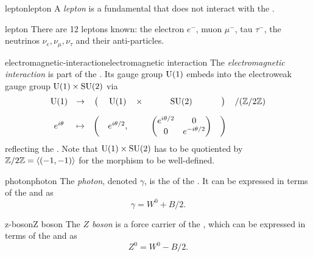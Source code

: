 
\begin{topic}{lepton}{lepton}
    A \emph{lepton} is a fundamental  that does not interact with the .
\end{topic}

\begin{example}{lepton}
    There are 12 leptons known: the electron $e^-$, muon $\mu^-$, tau $\tau^-$, the neutrinos $\nu_e, \nu_\mu, \nu_\tau$ and their anti-particles.
\end{example}

\begin{topic}{electromagnetic-interaction}{electromagnetic interaction}
    The \emph{electromagnetic interaction} is part of the . Its gauge group $\textup{U}(1)$ embeds into the electroweak gauge group $\textup{U}(1) \times \textup{SU}(2)$ via
    \[ \begin{array}{cccccccc}
        \textup{U}(1) & \to & \big( & \textup{U}(1) & \times & \textup{SU}(2) & \big) & / (\mathbb{Z} / 2 \mathbb{Z}) \\[10pt]
        e^{i \theta} & \mapsto & \bigg( & e^{i \theta / 2}, && \begin{pmatrix} e^{i \theta / 2} & 0 \\ 0 & e^{- i \theta / 2} \end{pmatrix} & \bigg) &
    \end{array} \]
    reflecting the . Note that $\textup{U}(1) \times \textup{SU}(2)$ has to be quotiented by $\mathbb{Z} / 2\mathbb{Z} = \langle (-1, -1) \rangle$ for the morphism to be well-defined.
\end{topic}

\begin{topic}{photon}{photon}
    The \emph{photon}, denoted $\gamma$, is the  of the . It can be expressed in terms of the  and  as
    \[ \gamma = W^0 + B / 2 . \]
\end{topic}

\begin{topic}{z-boson}{Z boson}
    The \emph{$Z$ boson} is a force carrier of the , which can be expressed in terms of the  and  as
    \[ Z^0 = W^0 - B / 2 . \]
\end{topic}


